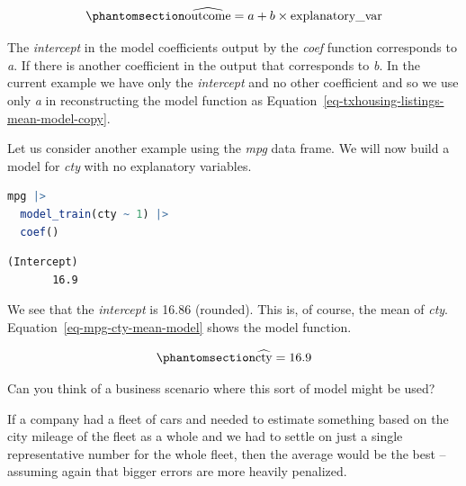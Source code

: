 \documentclass[
  12pt,
  letterpaper,
  DIV=11,
  numbers=noendperiod]{scrreprt}
\begin{document}
\begin{equation}\phantomsection\label{eq-generic}{
\widehat{\text{outcome}} = a + b\times\text{explanatory\_var}
}\end{equation}

The \emph{intercept} in the model coefficients output by the \emph{coef}
function corresponds to \emph{a}. If there is another coefficient in the
output that corresponds to \emph{b}. In the current example we have only
the \emph{intercept} and no other coefficient and so we use only
\emph{a} in reconstructing the model function as
Equation~\ref{eq-txhousing-listings-mean-model-copy}.

Let us consider another example using the \emph{mpg} data frame. We will
now build a model for \emph{cty} with no explanatory variables.

\begin{lstlisting}[language=R]
mpg |> 
  model_train(cty ~ 1) |> 
  coef()
\end{lstlisting}

\begin{lstlisting}
(Intercept) 
       16.9 
\end{lstlisting}

We see that the \emph{intercept} is 16.86 (rounded). This is, of course,
the mean of \emph{cty}. Equation~\ref{eq-mpg-cty-mean-model} shows the
model function.

\begin{equation}\phantomsection\label{eq-mpg-cty-mean-model}{
\widehat{\text{cty}} = 16.9
}\end{equation}

\begin{tcolorbox}[enhanced jigsaw, colback=white, leftrule=.75mm, toprule=.15mm, bottomtitle=1mm, breakable, coltitle=black, toptitle=1mm, title={Quick Check}, opacitybacktitle=0.6, colbacktitle=quarto-callout-note-color!10!white, arc=.35mm, left=2mm, colframe=quarto-callout-note-color-frame, titlerule=0mm, rightrule=.15mm, bottomrule=.15mm, opacityback=0]

Can you think of a business scenario where this sort of model might be
used?

\end{tcolorbox}

\begin{tcolorbox}[enhanced jigsaw, colback=white, leftrule=.75mm, toprule=.15mm, bottomtitle=1mm, breakable, coltitle=black, toptitle=1mm, title={Suggested answer}, opacitybacktitle=0.6, colbacktitle=quarto-callout-note-color!10!white, arc=.35mm, left=2mm, colframe=quarto-callout-note-color-frame, titlerule=0mm, rightrule=.15mm, bottomrule=.15mm, opacityback=0]

If a company had a fleet of cars and needed to estimate something based
on the city mileage of the fleet as a whole and we had to settle on just
a single representative number for the whole fleet, then the average
would be the best -- assuming again that bigger errors are more heavily
penalized.

\end{tcolorbox}
\end{document}
